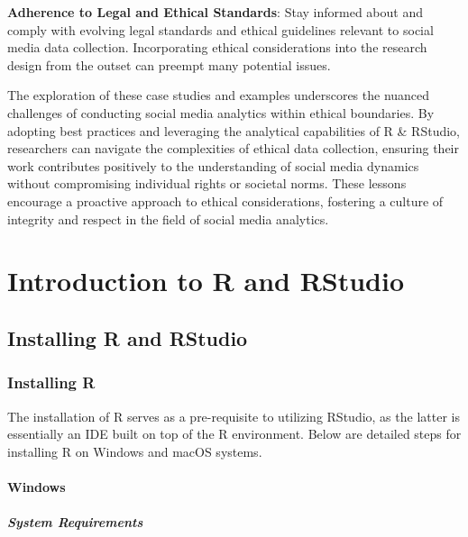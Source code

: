 \documentclass[
]{book}
\begin{document}
\textbf{Adherence to Legal and Ethical Standards}: Stay informed about and comply with evolving legal standards and ethical guidelines relevant to social media data collection. Incorporating ethical considerations into the research design from the outset can preempt many potential issues.

The exploration of these case studies and examples underscores the nuanced challenges of conducting social media analytics within ethical boundaries. By adopting best practices and leveraging the analytical capabilities of R \& RStudio, researchers can navigate the complexities of ethical data collection, ensuring their work contributes positively to the understanding of social media dynamics without compromising individual rights or societal norms. These lessons encourage a proactive approach to ethical considerations, fostering a culture of integrity and respect in the field of social media analytics.

\hypertarget{introduction-to-r-and-rstudio}{%
\chapter{Introduction to R and RStudio}\label{introduction-to-r-and-rstudio}}

\hypertarget{installing-r-and-rstudio}{%
\section{Installing R and RStudio}\label{installing-r-and-rstudio}}

\hypertarget{installing-r}{%
\subsection*{Installing R}\label{installing-r}}

The installation of R serves as a pre-requisite to utilizing RStudio, as the latter is essentially an IDE built on top of the R environment. Below are detailed steps for installing R on Windows and macOS systems.

\hypertarget{windows}{%
\subsubsection*{Windows}\label{windows}}

\hypertarget{system-requirements}{%
\paragraph*{System Requirements}\label{system-requirements}}
\end{document}
